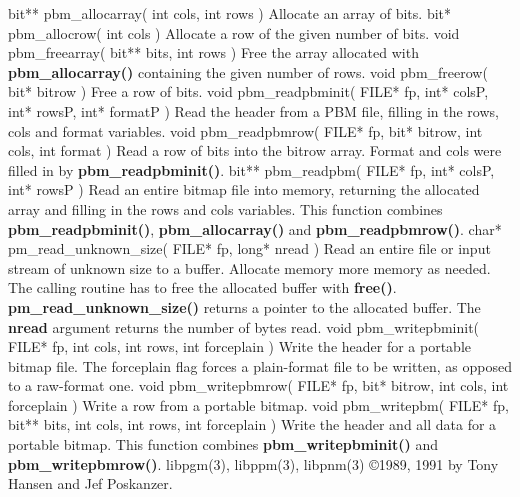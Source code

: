 \Ss
bit** pbm\_allocarray( int cols, int rows )
\Se
Allocate an array of bits.
\Ss
bit* pbm\_allocrow( int cols )
\Se
Allocate a row of the given number of bits.
\Ss
void pbm\_freearray( bit** bits, int rows )
\Se
Free the array allocated with
{\bf pbm\_allocarray()}
containing the given number
of rows.
\Ss
void pbm\_freerow( bit* bitrow )
\Se
Free a row of bits.
\Ss
void pbm\_readpbminit( FILE* fp, int* colsP, int* rowsP, int* formatP )
\Se
Read the header from a PBM file, filling in the rows, cols and format
variables.
\Ss
void pbm\_readpbmrow( FILE* fp, bit* bitrow, int cols, int format )
\Se
Read a row of bits into the bitrow array.
Format and cols were filled in by
{\bf pbm\_readpbminit()}{\rm .}
\Ss
bit** pbm\_readpbm( FILE* fp, int* colsP, int* rowsP )
\Se
Read an entire bitmap file into memory, returning the allocated array and
filling in the rows and cols variables.
This function combines
{\bf pbm\_readpbminit()}{\rm ,}
{\bf pbm\_allocarray()}
and
{\bf pbm\_readpbmrow()}{\rm .}
\Ss
char* pm\_read\_unknown\_size( FILE* fp, long* nread )
\Se
Read an entire file or input stream of unknown size to a buffer.
Allocate memory more memory as needed. The calling routine has
to free the allocated buffer with
{\bf free()}{\rm .}
{\bf pm\_read\_unknown\_size()}
returns a pointer to the allocated buffer. The
{\bf nread}
argument returns the number of bytes read.
\Ss
void pbm\_writepbminit( FILE* fp, int cols, int rows, int forceplain )
\Se
Write the header for a portable bitmap file.
The forceplain flag forces a plain-format file to be written, as opposed
to a raw-format one.
\Ss
void pbm\_writepbmrow( FILE* fp, bit* bitrow, int cols, int forceplain )
\Se
Write a row from a portable bitmap.
\Ss
void pbm\_writepbm( FILE* fp, bit** bits, int cols, int rows, int forceplain )
\Se
Write the header and all data for a portable bitmap.
This function combines
{\bf pbm\_writepbminit()}
and
{\bf pbm\_writepbmrow()}{\rm .}
libpgm(3), libppm(3), libpnm(3)
\copyright 1989, 1991 by Tony Hansen and Jef Poskanzer.
%
 
